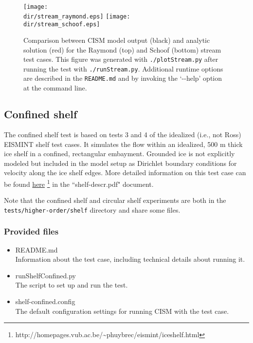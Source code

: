 	
\begin{figure}[H]
  \begin{center}
	\texttt{[image: \\dir/stream\_raymond.eps]}
	\texttt{[image: \\dir/stream\_schoof.eps]}
  \end{center}
  \caption{Comparison between CISM model output (black) and analytic solution (red) for the Raymond (top) and Schoof (bottom) stream test cases. This figure was generated with \texttt{./plotStream.py} after running the test with \texttt{./runStream.py}.
Additional runtime options are described in the \texttt{README.md} and by invoking the `-{}-help' option at the command line.}
  \label{fig:stream-results}
\end{figure} 

\subsection{Confined shelf}
The confined shelf test is based on tests 3 and 4 of the idealized (i.e., not Ross) EISMINT shelf test 
cases.  It simulates the flow within an idealized, 500 m thick ice shelf in a 
confined, rectangular embayment.  Grounded ice is not explicitly modeled but included in the 
model setup as Dirichlet boundary conditions for velocity along the ice shelf edges.
More detailed information on this test case can be found 
\href{http://homepages.vub.ac.be/~phuybrec/eismint/iceshelf.html}{here}
\footnote{http://homepages.vub.ac.be/\textasciitilde{}phuybrec/eismint/iceshelf.html} in the 
``shelf-descr.pdf" document.

Note that the confined shelf and circular shelf experiments are both in the 
\texttt{tests/higher-order/shelf} directory and share some files.

\subsubsection{Provided files}

\begin{itemize}
	\item README.md \\
		Information about the test case, including technical details about running it.
	\item runShelfConfined.py \\
		The script to set up and run the test.
	\item shelf-confined.config \\
  The default configuration settings for running CISM with the test case.
\end{itemize}

